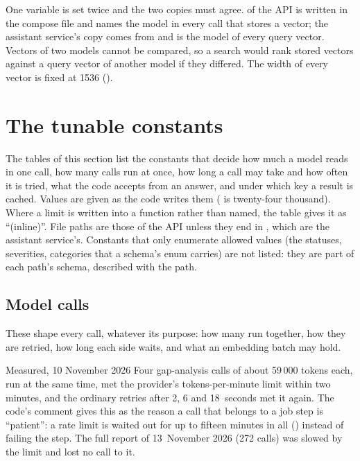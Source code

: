 One variable is set twice and the two copies must agree.  of the API is
written in the compose file and names the model in every call that stores a vector; the
assistant service's copy comes from  and is the model of every query vector.
Vectors of two models cannot be compared, so a search would rank stored vectors against a
query vector of another model if they differed. The width of every vector is fixed at 1536 ().


\section{The tunable constants}\label{sec:config:constants}

The tables of this section list the constants that decide how much a model reads in one call,
how many calls run at once, how long a call may take and how often it is tried, what the code
accepts from an answer, and under which key a result is cached. Values are given as the code
writes them ( is twenty-four thousand). Where a limit is written into a function
rather than named, the table gives it as \enquote{(inline)}. File paths are those of the API
unless they end in , which are the assistant service's. Constants that only enumerate
allowed values (the statuses, severities, categories that a schema's enum carries) are not
listed: they are part of each path's schema, described with the path.


\subsection{Model calls}\label{sec:config:calls}

These shape every call, whatever its purpose: how many run together, how they are retried,
how long each side waits, and what an embedding batch may hold.

\begin{lessonbox}{Measured, 10 November 2026}
Four gap-analysis calls of about 59\,000 tokens each, run at the same time, met the
provider's tokens-per-minute limit within two minutes, and the ordinary retries after 2, 6
and 18~seconds met it again. The code's comment gives this as the reason a call that belongs to a job step is
\enquote{patient}: a rate limit is waited out for up to fifteen minutes in all
() instead of failing the step. The full report of
13~November 2026 (272 calls) was slowed by the limit and lost no call to it.
\end{lessonbox}

